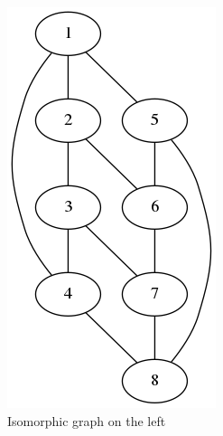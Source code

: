 \begin{figure}[!tbp]
  \begin{subfigure}[b]{0.2\textwidth}
    \includegraphics[width=\textwidth]{isomorphismleft}
    \caption{Isomorphic graph on the left}
    \label{fig:isomorphism}
  \end{subfigure}
  \hfill
  \begin{subfigure}[b]{0.4\textwidth}

\end{subfigure}
\end{figure}
